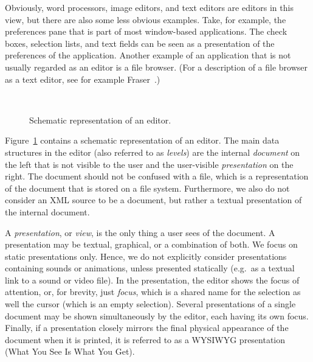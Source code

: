 \documentclass{speauth}
\begin{document}
Obviously, word processors, image editors, and text editors are editors in this view, but there are also some less obvious examples. Take, for example, the preferences pane that is part of most window-based applications. The check boxes, selection lists, and text fields can be seen as a presentation of the preferences of the application. Another example of an application that is not usually regarded as an editor is a file browser. (For a description of a file browser as a text editor, see for example Fraser~\cite{fraser80generalizedEditor}.)

\begin{figure}

\begin{small}

\begin{center}

\begin{center}

~\hspace{1.7cm}

\end{center}\caption{Schematic representation of an editor.}\label{editor} 

\end{center}

\end{small}

\end{figure}

Figure~\ref{editor} contains a schematic representation of an editor. The main data structures in the editor (also referred to as {\em levels}) are the internal {\em document} on the left that is not visible to the user and the user-visible {\em presentation} on the right. The document should not be confused with a file, which is a representation of the document that is stored on a file system. Furthermore, we also do not consider an XML source to be a document, but rather a textual presentation of the internal document.


A {\em presentation}, or {\em view}, is the only thing a user sees of the document. A presentation may be textual, graphical, or a combination of both. We focus on static presentations only. Hence, we do not explicitly consider presentations containing sounds or animations, unless presented statically (e.g.\ as a textual link to a sound or video file). In the presentation, the editor shows the focus of attention, or, for brevity, just {\em focus}, which is a shared name for the selection as well the cursor (which is an empty selection).  Several presentations of a single document may be shown simultaneously by the editor, each having its own focus. Finally, if a presentation closely mirrors the final physical appearance of the document when it is printed, it is referred to as a WYSIWYG presentation (What You See Is What You Get).
\end{document}

